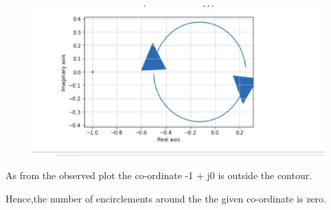 \begin{enumerate}[label=\thesection.\arabic*.,ref=\thesection.\theenumi]
\begin{figure}[!h]
  \includegraphics[width=\columnwidth]{./figs/pythonnyquistplot.eps}
 \end{figure}

As from the observed plot the co-ordinate -1 + j0 is outside the contour.


\bigskip


Hence,the number of encirclements around the the given co-ordinate is zero.
\end{enumerate}
